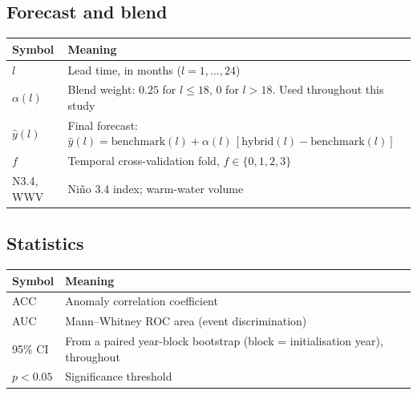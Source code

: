\subsection*{Forecast and blend}
\begin{center}
\begin{tabular}{@{}ll@{}}
\toprule
Symbol & Meaning \\
\midrule
$l$ & Lead time, in months ($l = 1,\dots,24$) \\
$\alpha(l)$ & Blend weight: $0.25$ for $l\le18$, $0$ for $l>18$. Used throughout this study \\
$\hat y(l)$ & Final forecast: $\hat y(l) = \mathrm{benchmark}(l) + \alpha(l)\,[\mathrm{hybrid}(l)-\mathrm{benchmark}(l)]$ \\
$f$ & Temporal cross-validation fold, $f \in \{0,1,2,3\}$ \\
N3.4, WWV & Ni\~no 3.4 index; warm-water volume \\
\bottomrule
\end{tabular}
\end{center}

\subsection*{Statistics}
\begin{center}
\begin{tabular}{@{}ll@{}}
\toprule
Symbol & Meaning \\
\midrule
ACC & Anomaly correlation coefficient \\
AUC & Mann--Whitney ROC area (event discrimination) \\
95\% CI & From a paired year-block bootstrap (block = initialisation year), throughout \\
$p<0.05$ & Significance threshold \\
\bottomrule
\end{tabular}
\end{center}
